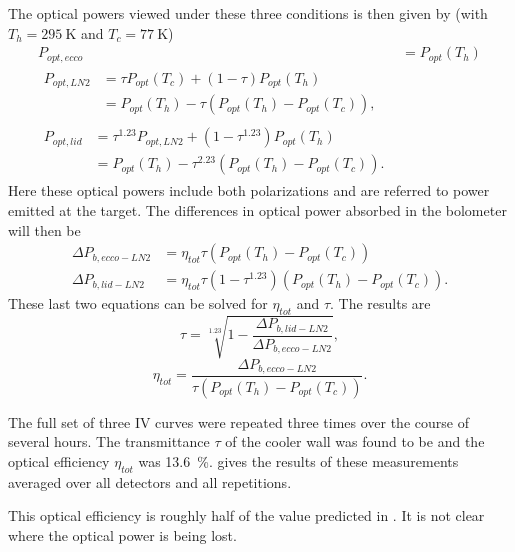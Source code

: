 The optical powers viewed under these three conditions is then given by (with $T_h = \SI{295}{\K}$ and $T_c = \SI{77}{\K}$)
\begin{align}
  P_{opt,ecco}  & = P_{opt}(T_h) \\
  \begin{split}
    P_{opt,LN2} & = \tau P_{opt}(T_c) + (1-\tau)P_{opt}(T_h) \\
              & = P_{opt}(T_h) - \tau (P_{opt}(T_h) - P_{opt}(T_c)),
  \end{split} \\
  \begin{split}
    P_{opt,lid} & = \tau^{1.23} P_{opt,LN2} + (1-\tau^{1.23})P_{opt}(T_h) \\
              & = P_{opt}(T_h) - \tau^{2.23}(P_{opt}(T_h) - P_{opt}(T_c)) .
  \end{split}
\end{align}
Here these optical powers include both polarizations and are referred to power emitted at the target.
The differences in optical power absorbed in the bolometer will then be
\begin{align}
  \Delta P_{b,ecco-LN2} & = \eta_{tot} \tau (P_{opt}(T_h) - P_{opt}(T_c)) \\
  \Delta P_{b,lid-LN2}  & = \eta_{tot} \tau (1-\tau^{1.23}) (P_{opt}(T_h) - P_{opt}(T_c)).
\end{align}
These last two equations can be solved for $\eta_{tot}$ and $\tau$. The results are
\begin{equation}
   \tau = \sqrt[1.23]{1 - \frac{\Delta P_{b,lid-LN2}}{\Delta P_{b,ecco-LN2}}},
\end{equation}
\begin{equation}
   \eta_{tot} = \frac{\Delta P_{b,ecco-LN2}}{ \tau ( P_{opt}(T_h) - P_{opt}(T_c) )} .
\end{equation}

The full set of three IV curves were repeated three times over the course of several hours.
The transmittance $\tau$ of the cooler wall was found to be  and the optical efficiency $\eta_{tot}$ was \SI{13.6}{\percent}. 
 gives the results of these measurements averaged over all detectors and all repetitions.

This optical efficiency is roughly half of the value predicted in .
It is not clear where the optical power is being lost.

